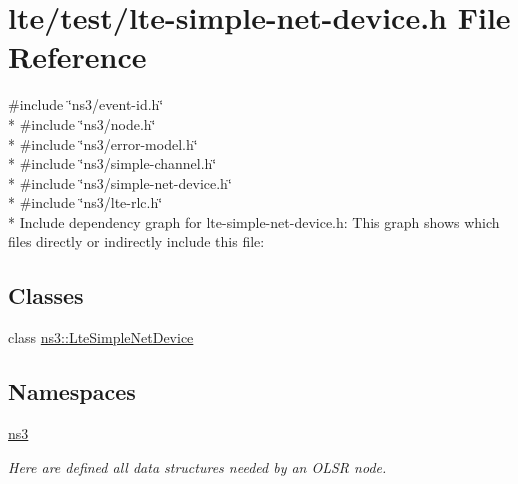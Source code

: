 \hypertarget{lte-simple-net-device_8h}{}\section{lte/test/lte-\/simple-\/net-\/device.h File Reference}
\label{lte-simple-net-device_8h}
{\ttfamily \#include \char`\"{}ns3/event-\/id.\+h\char`\"{}}\\*
{\ttfamily \#include \char`\"{}ns3/node.\+h\char`\"{}}\\*
{\ttfamily \#include \char`\"{}ns3/error-\/model.\+h\char`\"{}}\\*
{\ttfamily \#include \char`\"{}ns3/simple-\/channel.\+h\char`\"{}}\\*
{\ttfamily \#include \char`\"{}ns3/simple-\/net-\/device.\+h\char`\"{}}\\*
{\ttfamily \#include \char`\"{}ns3/lte-\/rlc.\+h\char`\"{}}\\*
Include dependency graph for lte-\/simple-\/net-\/device.h\+:
This graph shows which files directly or indirectly include this file\+:
\subsection*{Classes}
\begin{DoxyCompactItemize}
\item 
class \hyperlink{classns3_1_1LteSimpleNetDevice}{ns3\+::\+Lte\+Simple\+Net\+Device}
\end{DoxyCompactItemize}
\subsection*{Namespaces}
\begin{DoxyCompactItemize}
\item 
 \hyperlink{namespacens3}{ns3}
\begin{DoxyCompactList}\small\item\em Here are defined all data structures needed by an O\+L\+SR node. \end{DoxyCompactList}\end{DoxyCompactItemize}
